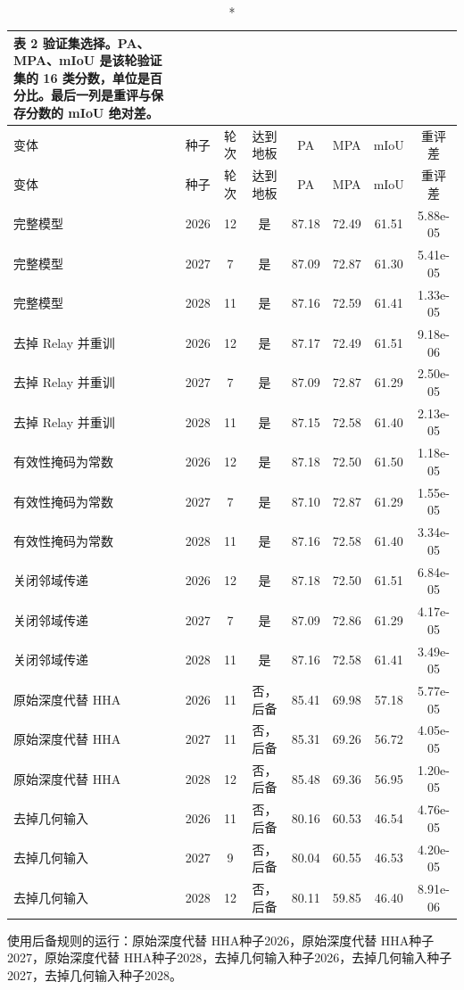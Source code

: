 \documentclass[11pt]{article}
\begin{document}
{\footnotesize\setlength{\tabcolsep}{3pt}
\begin{longtable}{lccccccc}
\caption*{表 2  验证集选择。PA、MPA、mIoU 是该轮验证集的 16 类分数，单位是百分比。最后一列是重评与保存分数的 mIoU 绝对差。}\\
\toprule
变体 & 种子 & 轮次 & 达到地板 & PA & MPA & mIoU & 重评差\\
\midrule
\endfirsthead
\toprule
变体 & 种子 & 轮次 & 达到地板 & PA & MPA & mIoU & 重评差\\
\midrule
\endhead
完整模型 & 2026 & 12 & 是 & 87.18 & 72.49 & 61.51 & 5.88e-05\\
完整模型 & 2027 & 7 & 是 & 87.09 & 72.87 & 61.30 & 5.41e-05\\
完整模型 & 2028 & 11 & 是 & 87.16 & 72.59 & 61.41 & 1.33e-05\\
去掉 Relay 并重训 & 2026 & 12 & 是 & 87.17 & 72.49 & 61.51 & 9.18e-06\\
去掉 Relay 并重训 & 2027 & 7 & 是 & 87.09 & 72.87 & 61.29 & 2.50e-05\\
去掉 Relay 并重训 & 2028 & 11 & 是 & 87.15 & 72.58 & 61.40 & 2.13e-05\\
有效性掩码为常数 & 2026 & 12 & 是 & 87.18 & 72.50 & 61.50 & 1.18e-05\\
有效性掩码为常数 & 2027 & 7 & 是 & 87.10 & 72.87 & 61.29 & 1.55e-05\\
有效性掩码为常数 & 2028 & 11 & 是 & 87.16 & 72.58 & 61.40 & 3.34e-05\\
关闭邻域传递 & 2026 & 12 & 是 & 87.18 & 72.50 & 61.51 & 6.84e-05\\
关闭邻域传递 & 2027 & 7 & 是 & 87.09 & 72.86 & 61.29 & 4.17e-05\\
关闭邻域传递 & 2028 & 11 & 是 & 87.16 & 72.58 & 61.41 & 3.49e-05\\
原始深度代替 HHA & 2026 & 11 & 否，后备 & 85.41 & 69.98 & 57.18 & 5.77e-05\\
原始深度代替 HHA & 2027 & 11 & 否，后备 & 85.31 & 69.26 & 56.72 & 4.05e-05\\
原始深度代替 HHA & 2028 & 12 & 否，后备 & 85.48 & 69.36 & 56.95 & 1.20e-05\\
去掉几何输入 & 2026 & 11 & 否，后备 & 80.16 & 60.53 & 46.54 & 4.76e-05\\
去掉几何输入 & 2027 & 9 & 否，后备 & 80.04 & 60.55 & 46.53 & 4.20e-05\\
去掉几何输入 & 2028 & 12 & 否，后备 & 80.11 & 59.85 & 46.40 & 8.91e-06\\
\bottomrule
\end{longtable}}
使用后备规则的运行：原始深度代替 HHA种子2026，原始深度代替 HHA种子2027，原始深度代替 HHA种子2028，去掉几何输入种子2026，去掉几何输入种子2027，去掉几何输入种子2028。
\end{document}
